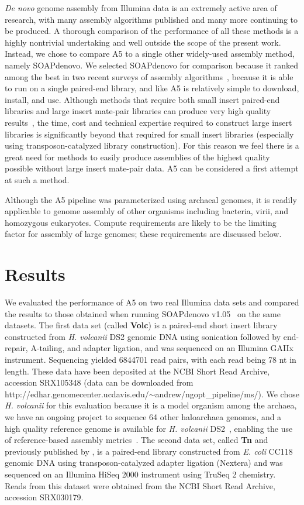 \documentclass[10pt]{article}
\begin{document}
\emph{De novo} genome assembly from Illumina data is an extremely active area of research, with many assembly algorithms published and many more continuing to be produced.
A thorough comparison of the performance of all these methods is a highly nontrivial undertaking and well outside the scope of the present  
work. Instead, we chose to compare A5 to a single other widely-used assembly method, namely SOAPdenovo. We selected SOAPdenovo for comparison
because it ranked among the best in two recent surveys of assembly algorithms~\cite{Earl2011,Salzberg2011}, because it is able to run on a single paired-end
library, and like A5 is relatively simple to download, install, and use. Although methods that require both small insert paired-end libraries
and large insert mate-pair libraries can produce very high quality results~\cite{Gnerre2011}, the time, cost and technical expertise required to construct large insert
libraries is significantly beyond that required for small insert libraries (especially using transposon-catalyzed library construction).
For this reason we feel there is a great need for methods to easily produce assemblies of the highest quality possible without large insert mate-pair data.
A5 can be considered a first attempt at such a method.

Although the A5 pipeline was parameterized using archaeal genomes, it is readily applicable to genome assembly of other organisms including bacteria, virii, and homozygous eukaryotes. Compute requirements are likely to be the limiting factor for assembly of large genomes; these requirements are discussed below.

\section*{Results}

We evaluated the performance of A5 on two real Illumina data sets and compared the results to
those obtained when running SOAPdenovo v1.05~\cite{Li2010} on the same datasets. The first data set (called \textbf{Volc}) is a paired-end short insert library constructed from \emph{H. volcanii} DS2 genomic DNA 
using sonication followed by end-repair, A-tailing, and adapter ligation, and was sequenced on an Illumina GAIIx instrument.
Sequencing yielded 6844701 read pairs, with each read being 78 nt in length. These data have been deposited at the NCBI Short Read Archive, accession SRX105348 (data can be downloaded
from http://edhar.genomecenter.ucdavis.edu/${\sim}$andrew/ngopt\_pipeline/ms/). 
We chose \emph{H. volcanii} for this evaluation because it is a model organism among the archaea, we have an ongoing project to sequence 64 other haloarchaea genomes, and a high quality reference genome is available for \emph{H. volcanii} DS2~\cite{Hartman2010}, enabling the use of reference-based assembly metrics~\cite{Darling2011}.  
The second data set, called \textbf{Tn} and previously published by \cite{Adey2010}, is a paired-end library constructed from \emph{E. coli} CC118 genomic DNA
using transposon-catalyzed adapter ligation (Nextera) and was sequenced on an Illumina HiSeq 2000 instrument using TruSeq 2 chemistry. 
Reads from this dataset were obtained from the NCBI Short Read Archive, accession SRX030179.
\end{document}
